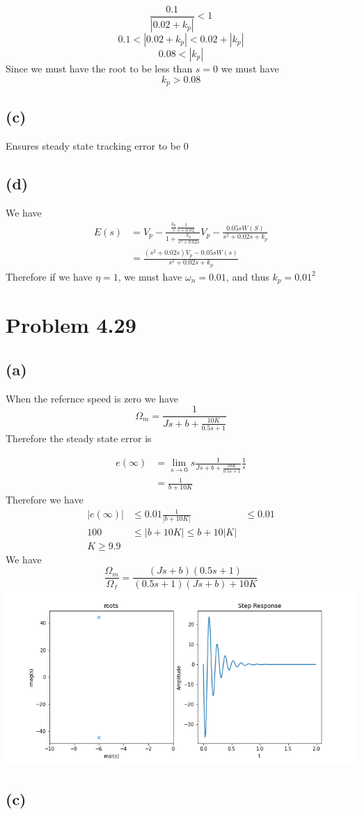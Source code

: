 \documentclass[12pt]{article}
\begin{document}
$$\frac{0.1}{|0.02+k_p|}<1$$
$$0.1<|0.02+k_p|<0.02+|k_p|$$
$$0.08<|k_p|$$
Since we must have the root to be less than $s=0$ we must have
$$\boxed{k_p>0.08}$$
\subsection*{(c)}
Ensures steady state tracking error to be $0$
\subsection*{(d)}
We have
\begin{align*}
    E(s)&=V_p-\frac{\frac{k_p}{s}\frac{1}{s+0.02}}{1+\frac{k_p}{s^2+0.02s}}
V_p-\frac{0.05sW(S)}{s^2+0.02s+k_p}\\
&=\frac{(s^2+0.02s)V_p-0.05sW(s)}{s^2+0.02s+k_p}
\end{align*}
Therefore if we have $\eta=1$, we must have $\omega_n=0.01$, and thus $\boxed{k_p=0.01^2}$
\section*{Problem 4.29}
\subsection*{(a)}
When the refernce speed is zero we have
$$\Omega_m=\frac{1}{Js+b+\frac{10K}{0.5s+1}}$$
Therefore the steady state error is

\begin{align*}
    e(\infty)&=\lim_{s\to0}s\frac{1}{Js+b+\frac{10K}{0.5s+1}}\frac{1}{s}\\
    &=\frac{1}{b+10K}
\end{align*}
Therefore we have
\begin{align*}
    |e(\infty)|&\leq 0.01
    \frac{1}{|b+10K|}&\leq 0.01\\
    100&\leq|b+10K|\leq b+10|K|\\
    \boxed{K\geq 9.9}
\end{align*}
We have
$$\frac{\Omega_m}{\Omega_f}=\frac{(Js+b)(0.5s+1)}{(0.5s+1)(Js+b)+10K}$$
\includegraphics[scale=0.5]{fig1}
\FloatBarrier
\subsection*{(c)}
\end{document}
